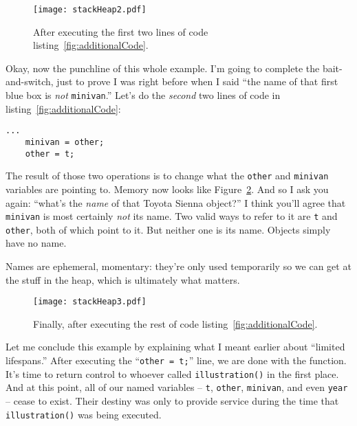 \begin{figure}
\centering
\texttt{[image: stackHeap2.pdf]}   %
\caption{After executing the first two lines of code
listing~\ref{fig:additionalCode}.}
\label{fig:stackHeap2}
\end{figure}



Okay, now the punchline of this whole example. I'm going to complete the
bait-and-switch, just to prove I was right before when I said ``the name of
that first blue box is \textit{not} \texttt{minivan}.'' Let's do the
\textit{second} two lines of code in listing~\ref{fig:additionalCode}:

\begin{Verbatim}[fontsize=\small,samepage=true,frame=single]
    ...
    minivan = other;
    other = t;
\end{Verbatim}

The result of those two operations is to change what the \texttt{other} and
\texttt{minivan} variables are pointing to. Memory now looks like
Figure~\ref{fig:stackHeap3}. And so I ask you again: ``what's the
\textit{name} of that Toyota Sienna object?'' I think you'll agree that
\texttt{minivan} is most certainly \textit{not} its name. Two valid ways to
refer to it are \texttt{t} and \texttt{other}, both of which point to it. But
neither one is its name. Objects simply have no name.

Names are ephemeral, momentary: they're only used temporarily so we can get at
the stuff in the heap, which is ultimately what matters.

\begin{figure}
\centering
\texttt{[image: stackHeap3.pdf]}   %
\caption{Finally, after executing the rest of code
listing~\ref{fig:additionalCode}.}
\label{fig:stackHeap3}
\end{figure}

Let me conclude this example by explaining what I meant earlier about
``limited lifespans.'' After executing the ``\texttt{other = t;}'' line, we are
done with the function. It's time to return control to whoever called
\texttt{illustration()} in the first place. And at this point, all of our
named variables -- \texttt{t}, \texttt{other}, \texttt{minivan}, and even
\texttt{year} -- cease to exist. Their destiny was only to provide service
during the time that \texttt{illustration()} was being executed. 

